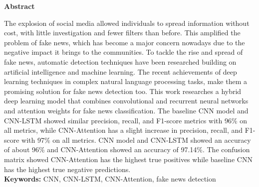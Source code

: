 \centerline{\large\textbf{Abstract}}

\vspace{1cm}

The explosion of social media allowed individuals to spread information without cost, with little investigation and fewer ﬁlters than before. This ampliﬁed the problem of fake news, which has become a major concern nowadays due to the negative impact it brings to the communities. To tackle the rise and spread of fake news, automatic detection techniques have been researched building on artiﬁcial intelligence and machine learning. The recent achievements of deep learning techniques in complex natural language processing tasks, make them a promising solution for fake news detection too. This work researches a hybrid deep learning model that combines convolutional and recurrent neural networks and attention weights for fake news classiﬁcation. The baseline CNN model and CNN-LSTM showed similar precision, recall, and F1-score metrics with 96\% on all metrics, while CNN-Attention has a slight increase in precision, recall, and F1-score with 97\% on all metrics. CNN model and CNN-LSTM showed an accuracy of about 96\% and CNN-Attention showed an accuracy of 97.14\%. The confusion matrix showed CNN-Attention has the highest true positives while baseline CNN has the highest true negative predictions. \\

\textbf{Keywords:}  CNN, CNN-LSTM, CNN-Attention, fake news detection

